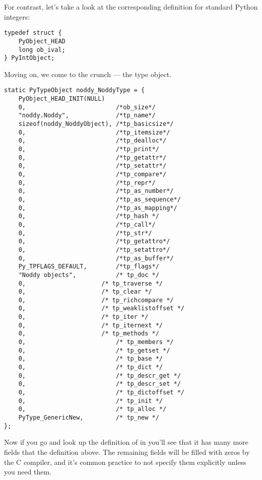 For contrast, let's take a look at the corresponding definition for
standard Python integers:

\begin{verbatim}
typedef struct {
    PyObject_HEAD
    long ob_ival;
} PyIntObject;
\end{verbatim}

Moving on, we come to the crunch --- the type object.

\begin{verbatim}
static PyTypeObject noddy_NoddyType = {
    PyObject_HEAD_INIT(NULL)
    0,                         /*ob_size*/
    "noddy.Noddy",             /*tp_name*/
    sizeof(noddy_NoddyObject), /*tp_basicsize*/
    0,                         /*tp_itemsize*/
    0,                         /*tp_dealloc*/
    0,                         /*tp_print*/
    0,                         /*tp_getattr*/
    0,                         /*tp_setattr*/
    0,                         /*tp_compare*/
    0,                         /*tp_repr*/
    0,                         /*tp_as_number*/
    0,                         /*tp_as_sequence*/
    0,                         /*tp_as_mapping*/
    0,                         /*tp_hash */
    0,                         /*tp_call*/
    0,                         /*tp_str*/
    0,                         /*tp_getattro*/
    0,                         /*tp_setattro*/
    0,                         /*tp_as_buffer*/
    Py_TPFLAGS_DEFAULT,        /*tp_flags*/
    "Noddy objects",           /* tp_doc */
    0,		               /* tp_traverse */
    0,		               /* tp_clear */
    0,		               /* tp_richcompare */
    0,		               /* tp_weaklistoffset */
    0,		               /* tp_iter */
    0,		               /* tp_iternext */
    0,		               /* tp_methods */
    0,                         /* tp_members */
    0,                         /* tp_getset */
    0,                         /* tp_base */
    0,                         /* tp_dict */
    0,                         /* tp_descr_get */
    0,                         /* tp_descr_set */
    0,                         /* tp_dictoffset */
    0,                         /* tp_init */
    0,                         /* tp_alloc */
    PyType_GenericNew,         /* tp_new */
};
\end{verbatim}

Now if you go and look up the definition of  in
 you'll see that it has many more fields that the
definition above.  The remaining fields will be filled with zeros by
the C compiler, and it's common practice to not specify them
explicitly unless you need them.  

